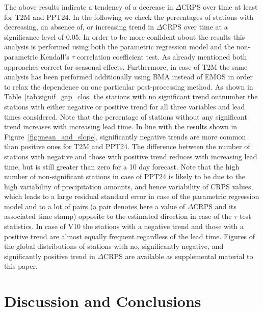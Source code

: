 The above results indicate a tendency of a decrease in $\Delta$CRPS
over time at least for T2M and PPT24. In the following we check the
percentages of stations with decreasing, an absence of, or increasing
trend in $\Delta$CRPS over time at a significance level of 0.05. In
order to be more confident about the results this analysis is
performed using both the parametric regression model and the
non-parametric Kendall's $\tau$ correlation coefficient test. As
already mentioned both approaches correct for seasonal effects.
Furthermore, in case of T2M the same analysis has been performed
additionally using BMA instead of EMOS in order to relax the
dependence on one particular post-processing method. As shown in
Table~\ref{tab:signif_gap_clos} the stations with no significant trend
outnumber the stations with either negative or positive trend for all
three variables and lead times considered. Note that the percentage of
stations without any significant trend increases with increasing lead
time. In line with the results shown in
Figure~\ref{fig:mean_and_slope}, significantly negative trends are
more common than positive ones for T2M and PPT24. The difference
between the number of stations with negative and those with positive
trend reduces with increasing lead time, but is still greater than
zero for a 10 day forecast. Note that the high number of
non-significant stations in case of PPT24 is likely to be due to the
high variability of precipitation amounts, and hence variability of
CRPS values, which leads to a large residual standard error in case of
the parametric regression model and to a lot of pairs (a pair denotes
here a value of $\Delta$CRPS and its associated time stamp) opposite
to the estimated direction in case of the $\tau$ test statistics. In
case of V10 the stations with a negative trend and those with a
positive trend are almost equally frequent regardless of the lead
time. Figures of the global distributions of stations with no,
significantly negative, and significantly positive trend in
$\Delta$CRPS are available as supplemental material to this paper.


\section{Discussion and Conclusions}
\label{sec:disc}

